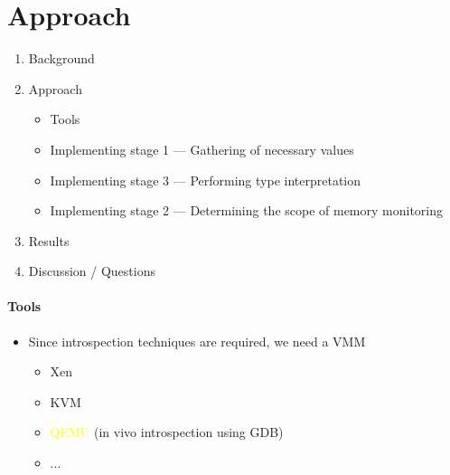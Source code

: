 \documentclass{i20lecture}
\begin{document}
\section{Approach}
\begin{frame}{\insertsection}
  \begin{enumerate}
   \item Background
    \item Approach
    \begin{itemize}
        \item Tools
        \item Implementing stage 1 --- Gathering of necessary values
        \item Implementing stage 3 --- Performing type interpretation
        \item Implementing stage 2 --- Determining the scope of memory monitoring
    \end{itemize}
    \item Results
    \item Discussion / Questions
  \end{enumerate}
\end{frame}

\begin{frame}{\insertsection}
  \framesubtitle{Tools}

  \begin{itemize}
   \item Since introspection techniques are required, we need a VMM
\pause
    \begin{itemize}
    \item Xen
    \item KVM
	\item \textcolor{yellow}{QEMU} (in vivo introspection using GDB)
    \item ...
    \end{itemize}
  \end{itemize}
\end{frame}
\end{document}
